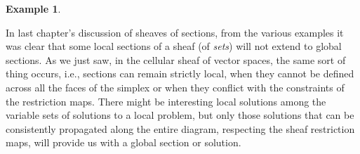\documentclass[11pt]{book}
\theoremstyle{definition}
\newtheorem{example}{Example}[section]
\theoremstyle{definition}
\theoremstyle{definition}
\theoremstyle{theorem}
\theoremstyle{definition}
\begin{document}
\begin{example}
\begin{center}
\begin{tikzpicture}[yscale=1.6, xscale=1.38]
		\end{tikzpicture} 
		\end{center} \par \noindent 
		In last chapter's discussion of sheaves of sections, from the various examples it was clear that some local sections of a sheaf (of \textit{sets}) will not extend to global sections. As we just saw, in the cellular sheaf of vector spaces, the same sort of thing occurs, i.e., sections can remain strictly local, when they cannot be defined across all the faces of the simplex or when they conflict with the constraints of the restriction maps. There might be interesting local solutions among the variable sets of solutions to a local problem, but only those solutions that can be consistently propagated along the entire diagram, respecting the sheaf restriction maps, will provide us with a global section or solution.
	\end{example}
\end{document}
